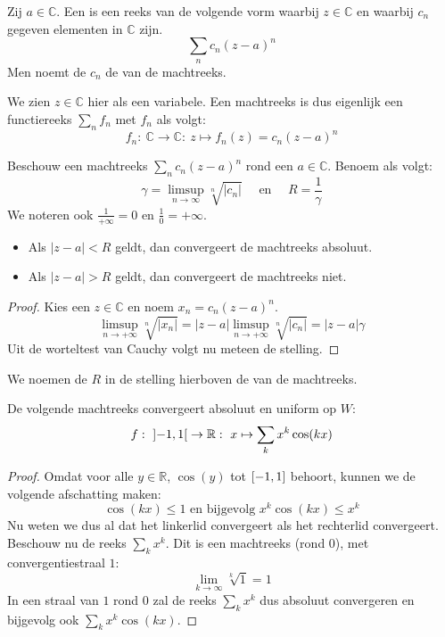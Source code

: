 \documentclass[main.tex]{subfiles}
\begin{document}
\begin{de}
  Zij $a \in \mathbb{C}$.
  Een  is een reeks van de volgende vorm waarbij $z\in\mathbb{C}$ en waarbij $c_{n}$ gegeven elementen in $\mathbb{C}$ zijn.
  \[ \sum_{n}c_{n}(z-a)^{n} \]
  Men noemt de $c_{n}$ de  van de machtreeks.
\end{de}

\begin{opm}
  We zien $z \in \mathbb{C}$ hier als een variabele.
  Een machtreeks is dus eigenlijk een functiereeks $\sum_{n}f_{n}$ met $f_{n}$ als volgt:
  \[ f_{n}:\ \mathbb{C} \rightarrow \mathbb{C}:\ z \mapsto f_{n}(z) = c_{n}(z-a)^{n} \]
\end{opm}

\begin{bst}
  Beschouw een machtreeks $\sum_{n}c_{n}(z-a)^{n}$ rond een $a\in \mathbb{C}$.
  Benoem als volgt:
  \[ \gamma = \limsup_{n \rightarrow \infty}\sqrt[n]{|c_{n}|} \quad\text{ en }\quad R = \frac{1}{\gamma} \]
  We noteren ook $\frac{1}{+\infty}=0$ en $\frac{1}{0} = +\infty$.
  \begin{itemize}
  \item Als $|z-a| < R$ geldt, dan convergeert de machtreeks absoluut.
  \item Als $|z-a| > R$ geldt, dan convergeert de machtreeks niet.
  \end{itemize}

  \begin{proof}
    Kies een $z\in \mathbb{C}$ en noem $x_{n}=c_{n}(z-a)^{n}$.
    \[ \limsup_{n\rightarrow +\infty}\sqrt[n]{|x_{n}|} = |z-a|\limsup_{n\rightarrow +\infty}\sqrt[n]{|c_{n}|} = |z-a|\gamma \]
    Uit de worteltest van Cauchy volgt nu meteen de stelling.
  \end{proof}
\end{bst}


\begin{de}
  We noemen de $R$ in de stelling hierboven de  van de machtreeks.
\end{de}

\begin{vb}
  De volgende machtreeks convergeert absoluut en uniform op $W$:
  \[ f:\ \interval[open]{-1}{1} \rightarrow \mathbb{R}:\ x \mapsto \sum_{k}x^{k}\cos(kx) \]
  
  \begin{proof}
    Omdat voor alle $y\in \mathbb{R}$, $\cos(y)$ tot $\interval{-1}{1}$ behoort, kunnen we de volgende afschatting maken:
    \[ \cos(kx) \le 1  \text{ en bijgevolg } x^{k}\cos(kx) \le x^{k} \]
    Nu weten we dus al dat het linkerlid convergeert als het rechterlid convergeert.
    Beschouw nu de reeks $\sum_{k}x^{k}$.
    Dit is een machtreeks (rond $0$), met convergentiestraal $1$:
    \[ \lim_{k\rightarrow \infty}\sqrt[k]{1} = 1 \]
    In een straal van $1$ rond $0$ zal de reeks $\sum_{k}x^{k}$ dus absoluut convergeren en bijgevolg ook $\sum_{k}x^{k}\cos(kx)$.
  \end{proof}
\end{vb}
\end{document}

